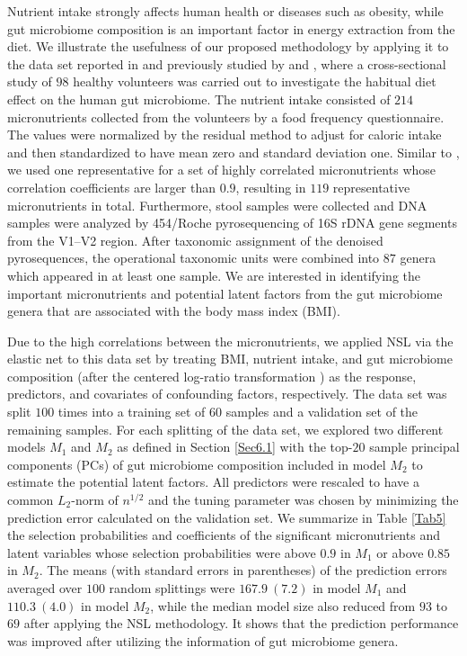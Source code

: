 \documentclass{statsoc}
\begin{document}
Nutrient intake strongly affects human health or diseases such as obesity, while gut microbiome composition is an important factor in energy extraction from the diet. We illustrate the usefulness
of our proposed methodology by applying it to the data set reported in \cite{Wu2011} and previously studied by \cite{ChenLi2013} and \cite{Lin2014}, where a cross-sectional study of $98$ healthy volunteers was carried out to investigate the habitual diet effect on the human gut microbiome. The nutrient intake consisted of $214$ micronutrients collected from the volunteers by a food frequency questionnaire. The values were normalized by the residual method to adjust for caloric intake and then standardized to have mean zero and standard deviation one. Similar to \cite{ChenLi2013}, we used one representative for a set of highly correlated micronutrients whose correlation coefficients are larger than $0.9$, resulting in $119$ representative micronutrients in total. Furthermore, stool samples were collected and DNA samples were analyzed by 454/Roche pyrosequencing of 16S rDNA gene segments from the V1--V2 region. After taxonomic assignment of the denoised pyrosequences, the operational taxonomic units were combined into $87$ genera which appeared in at least one sample. We are interested in identifying the important micronutrients and potential latent factors from the gut microbiome genera that are associated with the body mass index (BMI).


Due to the high correlations between the micronutrients, we applied NSL via the elastic net \citep{Zou2005} to this data set by treating BMI, nutrient intake, and gut microbiome composition (after the centered log-ratio transformation \citep{Aitchison83}) as the response, predictors, and covariates of confounding factors, respectively. The data set was split $100$ times into a training set of $60$ samples and a validation set of the remaining samples. For each splitting of the data set, we explored two different models $M_1$ and $M_2$ as defined in Section \ref{Sec6.1} with the top-$20$ sample principal components (PCs) of gut microbiome composition included in model $M_2$ to estimate the potential latent factors. All predictors were rescaled to have a common $L_2$-norm of $n^{1/2}$ and the tuning parameter was chosen by minimizing the prediction error calculated on the validation set. We summarize in Table \ref{Tab5} the selection probabilities and coefficients of the significant micronutrients and latent variables whose selection probabilities were above $0.9$ in $M_1$ or above $0.85$ in $M_2$. The means (with standard errors in parentheses) of the prediction errors averaged over $100$ random splittings were $167.9 \ (7.2)$ in model $M_1$ and $110.3 \ (4.0)$ in model $M_2$, while the median model size also reduced from $93$ to $69$ after applying the NSL methodology. It shows that the prediction performance was improved after utilizing the information of gut microbiome genera.
\end{document}
